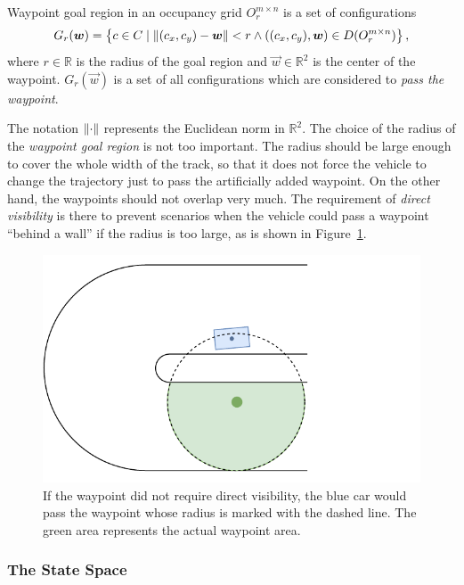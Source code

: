 \begin{defn}[Waypoint]
	Waypoint goal region in an occupancy grid $O_r^{m\times n}$ is a set of configurations
	\[
	G_r(\bm{w})=\left\{c\in C \mid \left\lVert(c_x, c_y)-\bm{w}\right\rVert<r \land ((c_x,c_y), \bm{w}) \in D(O_r^{m\times n}) \right\},
	\]
	where $r\in \mathbb{R}$ is the radius of the goal region and $\vec{w}\in\mathbb{R}^2$ is the center of the waypoint. $G_r(\vec{w})$ is a set of all configurations which are considered to \textit{pass the waypoint}.
\end{defn}

The notation $\left\lVert\cdot\right\rVert$ represents the Euclidean norm in $\mathbb{R}^2$. The choice of the radius of the \textit{waypoint goal region} is not too important. The radius should be large enough to cover the whole width of the track, so that it does not force the vehicle to change the trajectory just to pass the artificially added waypoint. On the other hand, the waypoints should not overlap very much. The requirement of \textit{direct visibility} is there to prevent scenarios when the vehicle could pass a waypoint ``behind a wall'' if the radius is too large, as is shown in Figure~\ref{fig:waypoints}.

\begin{figure}
	\centering
	\includegraphics[width=\textwidth,trim=0 0 80 0, clip]{../img/waypoint_behind_wall}
	\caption{If the waypoint did not require direct visibility, the blue car would pass the waypoint whose radius is marked with the dashed line. The green area represents the actual waypoint area.}
	\label{fig:waypoints}
\end{figure}

\subsubsection{The State Space}

